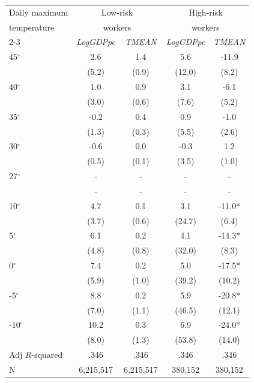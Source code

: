\begin{table}[htbp]
\centering
\begin{tabular}{lcccc}
\hline\hline
Daily maximum & \multicolumn{2}{c}{Low-risk} & \multicolumn{2}{c}{High-risk} \\
temperature & \multicolumn{2}{c}{workers} & \multicolumn{2}{c}{workers} \\
\cline{2-3} \cline{4-5}
 & \textit{LogGDPpc} & \textit{TMEAN} & \textit{LogGDPpc} & \textit{TMEAN} \\
\hline
45$^\circ$ & 2.6 & 1.4 & 5.6 & -11.9 \\
 & (5.2) & (0.9) & (12.0) & (8.2) \\
40$^\circ$ & 1.0 & 0.9 & 3.1 & -6.1 \\
 & (3.0) & (0.6) & (7.6) & (5.2) \\
35$^\circ$ & -0.2 & 0.4 & 0.9 & -1.0 \\
 & (1.3) & (0.3) & (5.5) & (2.6) \\
30$^\circ$ & -0.6 & 0.0 & -0.3 & 1.2 \\
 & (0.5) & (0.1) & (3.5) & (1.0) \\
27$^\circ$ & - & - & - & - \\
 & - & - & - & - \\
10$^\circ$ & 4.7 & 0.1 & 3.1 & -11.0* \\
 & (3.7) & (0.6) & (24.7) & (6.4) \\
5$^\circ$ & 6.1 & 0.2 & 4.1 & -14.3* \\
 & (4.8) & (0.8) & (32.0) & (8.3) \\
0$^\circ$ & 7.4 & 0.2 & 5.0 & -17.5* \\
 & (5.9) & (1.0) & (39.2) & (10.2) \\
-5$^\circ$ & 8.8 & 0.2 & 5.9 & -20.8* \\
 & (7.0) & (1.1) & (46.5) & (12.1) \\
-10$^\circ$ & 10.2 & 0.3 & 6.9 & -24.0* \\
 & (8.0) & (1.3) & (53.8) & (14.0) \\
\hline
Adj \(R\)-squared & .346 & .346 & .346 & .346 \\
N & 6,215,517 & 6,215,517 & 380,152 & 380,152 \\
\hline\hline
\end{tabular}
\end{table}
